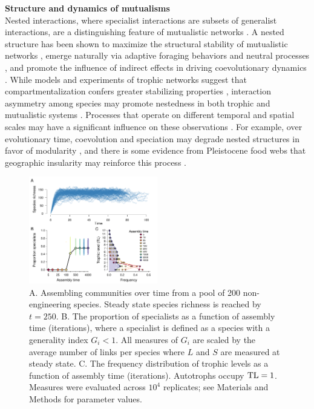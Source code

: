 \documentclass[twocolumn,preprintnumbers,amsmath,amssymb,superscriptaddress]{revtex4}
\begin{document}
\vspace{-3mm}
\noindent \textbf{Structure and dynamics of mutualisms}\\
Nested interactions, where specialist interactions are subsets of generalist interactions, are a distinguishing feature of mutualistic networks \cite{Bascompte2003}.
A nested structure has been shown to maximize the structural stability of mutualistic networks \cite{Rohr2014}, emerge naturally via adaptive foraging behaviors \cite{Valdovinos2016,Valdovinos2019} and neutral processes \cite{Krishna2008}, and promote the influence of indirect effects in driving coevolutionary dynamics \cite{Guimaraes2017}.
While models and experiments of trophic networks suggest that compartmentalization confers greater stabilizing properties \cite{Stouffer2011,Gilarranz2017}, interaction asymmetry among species may promote nestedness in both trophic \cite{Araujo2010} and mutualistic systems \cite{Pires2011}.
Processes that operate on different temporal and spatial scales may have a significant influence on these observations \cite{Massol2011}.
For example, over evolutionary time, coevolution and speciation may degrade nested structures in favor of modularity \cite{Ponisio2019}, and there is some evidence from Pleistocene food webs that geographic insularity may reinforce this process \cite{Yeakel2013}.

\vspace{-4mm}
\begin{figure}[h!]
\centering
\includegraphics[width=0.5\textwidth]{fig_trophic2.pdf}
\vspace{-6mm}
\caption{
A. Assembling communities over time from a pool of 200 non-engineering species. 
Steady state species richness is reached by $t=250$.
B. The proportion of specialists as a function of assembly time (iterations), where a specialist is defined as a species with a generality index $G_i < 1$.
All measures of $G_i$ are scaled by the average number of links per species where $L$ and $S$ are measured at steady state.
C. The frequency distribution of trophic levels as a function of assembly time (iterations). 
Autotrophs occupy ${\rm TL}=1$.
Measures were evaluated across $10^4$ replicates; see Materials and Methods for parameter values.
\vspace{-3mm}
}
\label{fig:trophic}
\end{figure}
\end{document}
